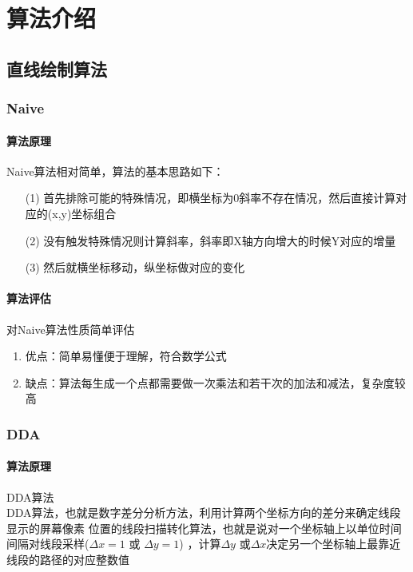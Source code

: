 \documentclass[a4paper,UTF8]{article}
\theoremstyle{definition}
\begin{document}
\section{算法介绍}
\subsection{直线绘制算法}

\subsubsection{Naive}
\paragraph{算法原理} 
Naive算法相对简单，算法的基本思路如下：
\begin{itemize}
    \item [(1)] 
    首先排除可能的特殊情况，即横坐标为0斜率不存在情况，然后直接计算对应的(x,y)坐标组合
    \item [(2)]
    没有触发特殊情况则计算斜率，斜率即X轴方向增大的时候Y对应的增量
    \item [(3)]
    然后就横坐标移动，纵坐标做对应的变化
  \end{itemize}


\paragraph{算法评估} 
对Naive算法性质简单评估
\begin{enumerate}
    \item 优点：简单易懂便于理解，符合数学公式
    \item 缺点：算法每生成一个点都需要做一次乘法和若干次的加法和减法，复杂度较高
\end{enumerate}

\subsubsection{DDA}
\paragraph{算法原理}
DDA算法\\
DDA算法，也就是数字差分分析方法，利用计算两个坐标方向的差分来确定线段显示的屏幕像素
位置的线段扫描转化算法，也就是说对一个坐标轴上以单位时间间隔对线段采样($\Delta x=1$ 或 $\Delta y=1$)
，计算$\Delta y$ 或$\Delta x$决定另一个坐标轴上最靠近线段的路径的对应整数值\cite{ref1}
\end{document}
